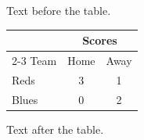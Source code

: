 \documentclass{article}
\begin{document}
Text before the table.

\begin{tabular}{|l|c|c|}\hline & \multicolumn{2}{c|}{Scores}\\\cline{2-3} Team & Home & Away\\\hline Reds & 3 & 1\\Blues & 0 & 2\\\hline\end{tabular}

Text after the table.
\end{document}
